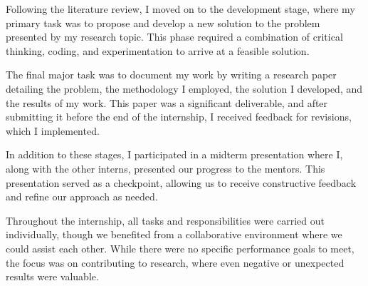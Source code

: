 Following the literature review, I moved on to the development stage, where my primary task was to propose and develop a
new solution to the problem presented by my research topic.
This phase required a combination of critical thinking, coding, and experimentation to arrive at a feasible solution.

The final major task was to document my work by writing a research paper detailing the problem, the methodology I
employed, the solution I developed, and the results of my work.
This paper was a significant deliverable, and after submitting it before the end of the internship, I received feedback
for revisions, which I implemented.

In addition to these stages, I participated in a midterm presentation where I, along with the other interns, presented
our progress to the mentors.
This presentation served as a checkpoint, allowing us to receive constructive feedback and refine our approach as
needed.

Throughout the internship, all tasks and responsibilities were carried out individually, though we benefited from a
collaborative environment where we could assist each other.
While there were no specific performance goals to meet, the focus was on contributing to research, where even negative
or unexpected results were valuable.
